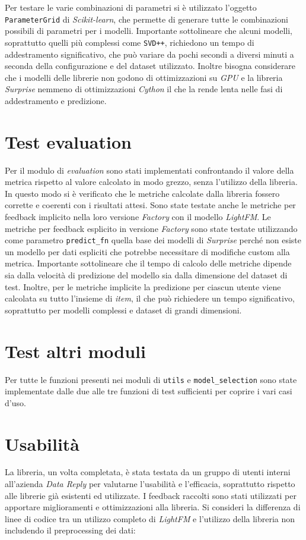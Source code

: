 Per testare le varie combinazioni di parametri si è utilizzato l'oggetto \\ \texttt{ParameterGrid} di \textit{Scikit-learn}, che permette di generare tutte le combinazioni possibili di parametri per i modelli. Importante sottolineare che alcuni modelli, soprattutto quelli più complessi come \texttt{SVD++}, richiedono un tempo di addestramento significativo, che può variare da pochi secondi a diversi minuti a seconda della configurazione e del dataset utilizzato. Inoltre bisogna considerare che i modelli delle librerie non godono di ottimizzazioni su \textit{GPU} e la libreria \textit{Surprise} nemmeno di ottimizzazioni \textit{Cython} il che la rende lenta nelle fasi di addestramento e predizione. 

\section{Test evaluation}

Per il modulo di \textit{evaluation} sono stati implementati confrontando il valore della metrica rispetto al valore calcolato in modo grezzo, senza l'utilizzo della libreria. In questo modo si è verificato che le metriche calcolate dalla libreria fossero corrette e coerenti con i risultati attesi. Sono state testate anche le metriche per feedback implicito nella loro versione \textit{Factory} con il modello \textit{LightFM}. Le metriche per feedback esplicito in versione \textit{Factory} sono state testate utilizzando come parametro \texttt{predict\_fn} quella base dei modelli di \textit{Surprise} perché non esiste un modello per dati espliciti che potrebbe necessitare di modifiche custom alla metrica. Importante sottolineare che il tempo di calcolo delle metriche dipende sia dalla velocità di predizione del modello sia dalla dimensione del dataset di test. Inoltre, per le metriche implicite la predizione per ciascun utente viene calcolata su tutto l'insieme di \textit{item}, il che può richiedere un tempo significativo, soprattutto per modelli complessi e dataset di grandi dimensioni.

\section{Test altri moduli}
Per tutte le funzioni presenti nei moduli di \texttt{utils} e \texttt{model\_selection} sono state implementate dalle due alle tre funzioni di test sufficienti per coprire i vari casi d'uso.

\section{Usabilità}
La libreria, un volta completata, è stata testata da un gruppo di utenti interni all'azienda \textit{Data Reply} per valutarne l'usabilità e l'efficacia, soprattutto rispetto alle librerie già esistenti ed utilizzate. I feedback raccolti sono stati utilizzati per apportare miglioramenti e ottimizzazioni alla libreria. Si consideri la differenza di linee di codice tra un utilizzo completo di \textit{LightFM} e l'utilizzo della libreria non includendo il preprocessing dei dati:

